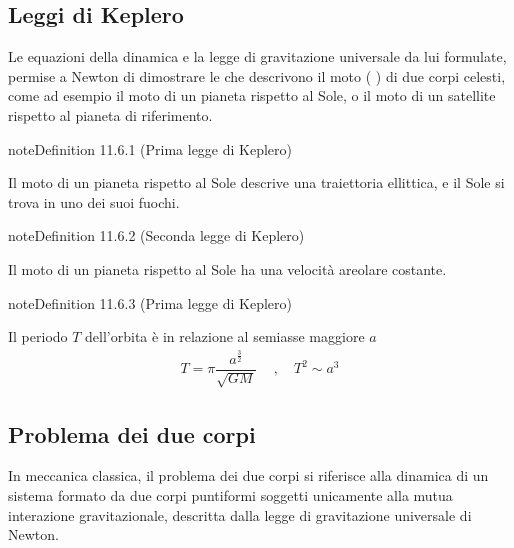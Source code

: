 \documentclass[letterpaper,10pt,italian]{jupyterBook}
\begin{document}
\subsection{Leggi di Keplero}
\label{\detokenize{ch/mechanics/dynamics-motion-gravitation:leggi-di-keplero}}
\sphinxAtStartPar
Le equazioni della dinamica e la legge di gravitazione universale da lui formulate, permise a Newton di dimostrare le  che descrivono il moto  ( ) di due corpi celesti, come ad esempio il moto di un pianeta rispetto al Sole, o il moto di un satellite rispetto al pianeta di riferimento.
\label{ch/mechanics/dynamics-motion-gravitation:definition-0}
\begin{sphinxadmonition}{note}{Definition 11.6.1 (Prima legge di Keplero)}



\sphinxAtStartPar
Il moto di un pianeta rispetto al Sole descrive una traiettoria ellittica, e il Sole si trova in uno dei suoi fuochi.
\end{sphinxadmonition}
\label{ch/mechanics/dynamics-motion-gravitation:definition-1}
\begin{sphinxadmonition}{note}{Definition 11.6.2 (Seconda legge di Keplero)}



\sphinxAtStartPar
Il moto di un pianeta rispetto al Sole ha una velocità areolare costante.
\end{sphinxadmonition}
\label{ch/mechanics/dynamics-motion-gravitation:definition-2}
\begin{sphinxadmonition}{note}{Definition 11.6.3 (Prima legge di Keplero)}



\sphinxAtStartPar
Il periodo \(T\) dell’orbita è in relazione al semiasse maggiore \(a\)
\begin{equation*}
\begin{split}T = \pi \dfrac{a^{\frac{3}{2}}}{\sqrt{GM}} \ \quad , \quad T^2 \sim a^3\end{split}
\end{equation*}\end{sphinxadmonition}


\subsection{Problema dei due corpi}
\label{\detokenize{ch/mechanics/dynamics-motion-gravitation:problema-dei-due-corpi}}\label{\detokenize{ch/mechanics/dynamics-motion-gravitation:physics-hs-mechanics-dynamics-motion-gravitation-two-bodies}}
\sphinxAtStartPar
In meccanica classica, il problema dei due corpi si riferisce alla dinamica di un sistema formato da due corpi puntiformi soggetti unicamente alla mutua interazione gravitazionale, descritta dalla legge di gravitazione universale di Newton.
\end{document}
